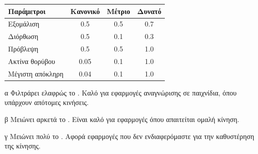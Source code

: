 \vspace{10pt}

\begin{center}
    \begin{threeparttable}
        \begin{tabular}{lccc}
            \toprule
            Παράμετροι & Κανονικό\tnote{α} & Μέτριο\tnote{β} & Δυνατό\tnote{γ} \\
            \midrule
            Εξομάλιση & 0.5 & 0.5 & 0.7 \\
            Διόρθωση & 0.5 & 0.1 & 0.3 \\
            Πρόβλεψη & 0.5 & 0.5 & 1.0 \\
            Ακτίνα θορύβου & 0.05 & 0.1 & 1.0 \\
            Μέγιστη απόκληρη & 0.04 & 0.1 & 1.0 \\
            \bottomrule
        \end{tabular}
        \begin{tablenotes}
            \item[α] Φιλτράρει ελαφρώς το . Καλό για εφαρμογές αναγνώρισης σε παιχνίδια, όπου υπάρχουν απότομες κινήσεις.
            \item[β] Μειώνει αρκετά το . Είναι καλό για εφαρμογές όπου απαιτείται ομαλή κίνηση.
            \item[γ] Μειώνει πολύ το . Αφορά εφαρμογές που δεν ενδιαφερόμαστε για την καθυστέρηση της κίνησης.
        \end{tablenotes}
    \end{threeparttable}
    \label{tab:filter-parameters}
\end{center}


